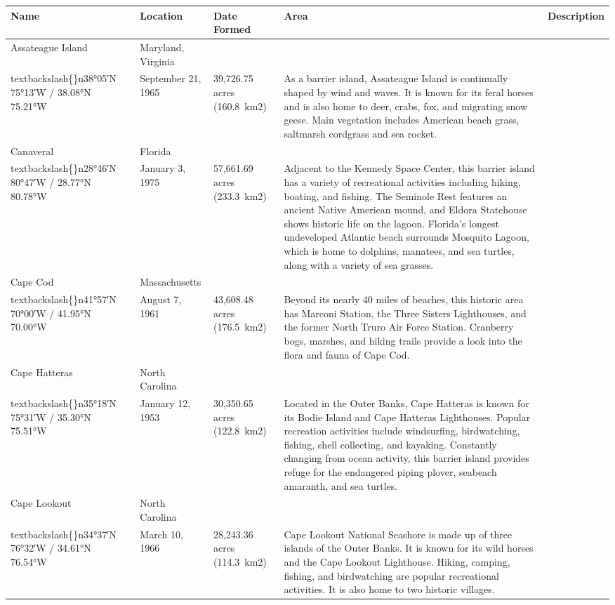 \documentclass{article}
\begin{document}
\begin{tabular}{lllll}
\toprule
Name & Location & Date Formed & Area & Description \\
\midrule
Assateague Island & Maryland, Virginia\\textbackslash\{\}n38°05′N 75°13′W﻿ / ﻿38.08°N 75.21°W & September 21, 1965 & 39,726.75 acres (160.8 km2) & As a barrier island, Assateague Island is continually shaped by wind and waves. It is known for its feral horses and is also home to deer, crabs, fox, and migrating snow geese. Main vegetation includes American beach grass, saltmarsh cordgrass and sea rocket. \\
Canaveral & Florida\\textbackslash\{\}n28°46′N 80°47′W﻿ / ﻿28.77°N 80.78°W & January 3, 1975 & 57,661.69 acres (233.3 km2) & Adjacent to the Kennedy Space Center, this barrier island has a variety of recreational activities including hiking, boating, and fishing. The Seminole Rest features an ancient Native American mound, and Eldora Statehouse shows historic life on the lagoon. Florida's longest undeveloped Atlantic beach surrounds Mosquito Lagoon, which is home to dolphins, manatees, and sea turtles, along with a variety of sea grasses. \\
Cape Cod & Massachusetts\\textbackslash\{\}n41°57′N 70°00′W﻿ / ﻿41.95°N 70.00°W & August 7, 1961 & 43,608.48 acres (176.5 km2) & Beyond its nearly 40 miles of beaches, this historic area has Marconi Station, the Three Sisters Lighthouses, and the former North Truro Air Force Station. Cranberry bogs, marshes, and hiking trails provide a look into the flora and fauna of Cape Cod. \\
Cape Hatteras & North Carolina\\textbackslash\{\}n35°18′N 75°31′W﻿ / ﻿35.30°N 75.51°W & January 12, 1953 & 30,350.65 acres (122.8 km2) & Located in the Outer Banks, Cape Hatteras is known for its Bodie Island and Cape Hatteras Lighthouses. Popular recreation activities include windsurfing, birdwatching, fishing, shell collecting, and kayaking. Constantly changing from ocean activity, this barrier island provides refuge for the endangered piping plover, seabeach amaranth, and sea turtles. \\
Cape Lookout & North Carolina\\textbackslash\{\}n34°37′N 76°32′W﻿ / ﻿34.61°N 76.54°W & March 10, 1966 & 28,243.36 acres (114.3 km2) & Cape Lookout National Seashore is made up of three islands of the Outer Banks. It is known for its wild horses and the Cape Lookout Lighthouse. Hiking, camping, fishing, and birdwatching are popular recreational activities. It is also home to two historic villages. \\

\end{tabular}
\end{document}
